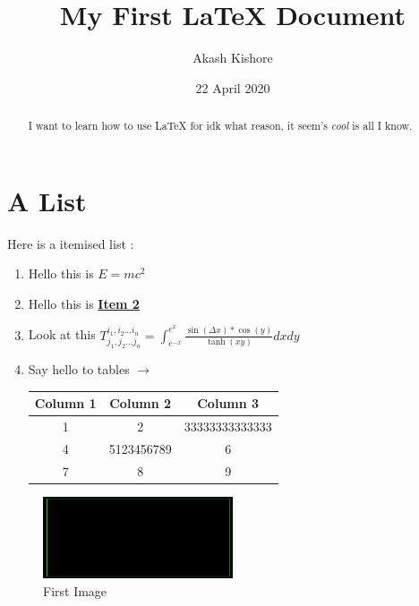 \documentclass[12pt,a4paper]{article}
\author{Akash Kishore}
\title{\textbf{My First {\LaTeX} Document}}
\date{22 April 2020}
\begin{document}
	\maketitle
	\begin{abstract}
	I want to learn how to use {\LaTeX} for idk what reason, it seem's \textsl{cool} is all I know. 
	\end{abstract}
	\tableofcontents
	\section{A List}
	Here is a itemised list :
	\begin{enumerate}
		\item Hello this is \emph{$E=mc^2$}
		\item Hello this is \textbf{\underline{Item 2}}
		\item Look at this $ T^{i_1,i_2 \dots i_n}_{j_1,j_2 \dots j_n} = \int_{e^{-x}}^{e^{x}} \frac{\sin(\Delta x)*\cos(y)}{\tanh(xy)}dxdy$
		\item Say hello to tables $\rightarrow$
			\begin{tabular}{| c | c | c |}
			\hline
			Column 1 & Column 2 & Column 3 \\ [0.5ex]
			\hline
			1 & 2 & 33333333333333 \\
			\hline
			4 & 5123456789 & 6 \\
			\hline
			7 & 8 & 9 \\
			\hline
			\end{tabular}
	\end{enumerate}
	\begin{figure}
		\centering
		\includegraphics[width=0.5\textwidth]{greenbox}
		\caption{First Image}
		\label{fig:image1}
	\end{figure}
\end{document}
